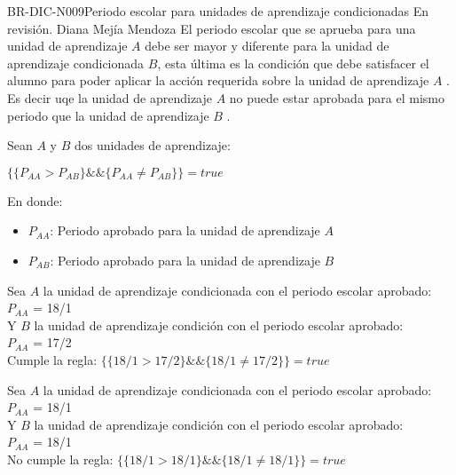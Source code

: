 \begin{BusinessRule}{BR-DIC-N009}{Periodo escolar para unidades de aprendizaje condicionadas}
	{\bcCondition}    %
	{\btEnabler}     %
	{\blControlling}    %
	\BRItem[Estado] En revisión.
	 Diana Mejía Mendoza
	\BRItem[Descripción] El periodo escolar que se aprueba para una unidad de aprendizaje $A$ debe ser mayor y diferente para la unidad de aprendizaje condicionada  $B$, esta última es la condición que debe satisfacer el alumno para poder aplicar la acción requerida sobre la unidad de aprendizaje $A$ . Es decir uqe la unidad de aprendizaje $A$ no puede estar aprobada para el mismo periodo que la unidad de aprendizaje $B$ .
	
	\BRItem[Sentencia] Sean $A$ y $B$ dos unidades de aprendizaje:
	\begin{center}
		$ \{ \{P_{AA} > P_{AB} \} \&\& \{P_{AA} \neq P_{AB}\} \} = true$ 
	\end{center}
	
	En donde:
	\begin{itemize}
		\item $P_{AA}$: Periodo aprobado para la unidad de aprendizaje $A$
		\item $P_{AB}$: Periodo aprobado para la unidad de aprendizaje $B$		
	\end{itemize} 
	
	
	Sea $A$ la unidad de aprendizaje condicionada con el periodo escolar aprobado: \\
	$P_{AA}$ = 18/1\\
	Y $B$ la unidad de aprendizaje condición con el periodo escolar aprobado:\\
	$P_{AA}$ = 17/2\\
	
	Cumple la regla:
	$ \{ \{18/1 > 17/2 \} \&\& \{18/1 \neq 17/2\} \} = true$ 
	
	Sea $A$ la unidad de aprendizaje condicionada con el periodo escolar aprobado: \\
	$P_{AA}$ = 18/1\\
	Y $B$ la unidad de aprendizaje condición con el periodo escolar aprobado:\\
	$P_{AA}$ = 18/1 \\
	
	No cumple la regla:
	$ \{ \{18/1 > 18/1 \} \&\& \{18/1 \neq 18/1\} \} = true$ 
	
\end{BusinessRule}

